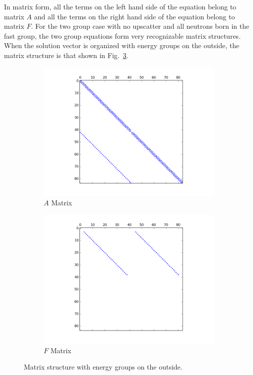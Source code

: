 \documentclass[12pt]{report}
\begin{document}
	In matrix form, all the terms on the left hand side of the equation belong to matrix $A$ and all the terms on the right hand side of the equation belong to matrix $F$. For the two group case with no upscatter and all neutrons born in the fast group, the two group equations form very recognizable matrix structures. When the solution vector is organized with energy groups on the outside, the matrix structure is that shown in Fig.~\ref{fig::groups_outside}. 
	\begin{figure}[ht]
		\centering
		\begin{subfigure}{.5\textwidth}
			\centering
			\includegraphics[width=.9\linewidth]{A_go.png}
			\caption{$A$ Matrix}
			\label{fig:A_go}
		\end{subfigure}%
		\begin{subfigure}{.5\textwidth}
			\centering
			\includegraphics[width=.9\linewidth]{F_go.png}
			\caption{$F$ Matrix}
			\label{fig:F_go}
		\end{subfigure}
		\caption{Matrix structure with energy groups on the outside.}
		\label{fig::groups_outside}
	\end{figure}
	
\end{document}
